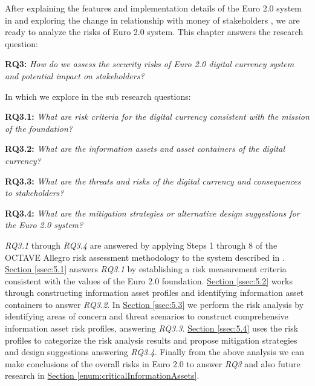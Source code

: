 \documentclass[a4paper,12pt]{article} %
\newcommand{\hypernameref}[1]{\hyperref[#1]{\nameref{#1}}}
\newcommand{\hypersectionref}[1]{\hyperref[#1]{Section \ref{#1}}}
\begin{document}
{After explaining the features and implementation details of the Euro 2.0 system in \hypernameref{sec:3} and exploring the change in relationship with money of stakeholders \hypernameref{sec:4}, we are ready to analyze the risks of Euro 2.0 system. This chapter answers the research question:

\begin{quoting}
	\textbf{RQ3:} \textit{How do we assess the security risks of Euro 2.0 digital currency system and potential impact on stakeholders?}
\end{quoting}

In which we explore in the sub research questions:
\begin{quoting}
	\textbf{RQ3.1: }\textit{What are risk criteria for the digital currency consistent with the mission of the foundation?}
\end{quoting}
\begin{quoting}
	\textbf{RQ3.2: }\textit{What are the information assets and asset containers of the digital currency?}
\end{quoting}
\begin{quoting}
	\textbf{RQ3.3: }\textit{What are the threats and risks of the digital currency and consequences to stakeholders?}
\end{quoting}
\begin{quoting}
	\textbf{RQ3.4: }\textit{What are the mitigation strategies or alternative design suggestions for the Euro 2.0 system?}
\end{quoting}

\textit{RQ3.1} through \textit{RQ3.4} are answered by applying Steps 1 through 8 of the OCTAVE Allegro risk assessment methodology\cite{CaralliIntroducingOCTAVE2007} to the system described in \hypernameref{sec:3}. \hypersectionref{ssec:5.1} answers \textit{RQ3.1} by establishing a risk measurement criteria consistent with the values of the Euro 2.0 foundation. \hypersectionref{ssec:5.2} works through constructing information asset profiles and identifying information asset containers to answer \textit{RQ3.2}. In \hypersectionref{ssec:5.3} we perform the risk analysis by identifying areas of concern and threat scenarios to construct comprehensive information asset risk profiles, answering \textit{RQ3.3}. \hypersectionref{ssec:5.4} uses the risk profiles to categorize the risk analysis results and propose mitigation strategies and design suggestions answering \textit{RQ3.4}. Finally from the above analysis we can make conclusions of the overall risks in Euro 2.0 to answer \textit{RQ3} and also future research in \hypersectionref{enum:criticalInformationAssets}.

}
\end{document}
